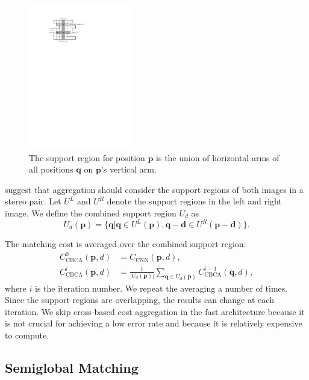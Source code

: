 \documentclass[twoside,11pt]{article}
\begin{document}
\begin{figure}[tb]
\begin{center}
\includegraphics[width=0.4\textwidth]{img/cross}
\end{center}
\caption{The support region for position $\mathbf{p}$ is the union of
horizontal arms of all positions $\mathbf{q}$ on $\mathbf{p}$'s vertical arm.}
\label{fig:cross}
\end{figure}

\citet{zhang2009cross} suggest that aggregation should consider the support
regions of both images in a stereo pair. Let $U^L$ and $U^R$ denote the support
regions in the left and right image. We define the combined support region
$U_d$ as
%
\begin{equation*}
U_d(\mathbf{p}) = \{\mathbf{q} | \mathbf{q} \in U^L(\mathbf{p}), \mathbf{q}-\mathbf{d}
\in U^R(\mathbf{p}-\mathbf{d})\}.
\end{equation*}

The matching cost is averaged over the combined support region:
%
\begin{align*}
C^0_{\text{CBCA}}(\mathbf{p}, d) &= C_{\text{CNN}}(\mathbf{p}, d), \\
C^i_{\text{CBCA}}(\mathbf{p}, d) &= \frac{1}{|U_d(\mathbf{p})|}
\sum_{\mathbf{q} \in U_d(\mathbf{p})} C^{i-1}_{\text{CBCA}}(\mathbf{q}, d),
\end{align*}
%
where $i$ is the iteration number. We repeat the averaging a number of times.
Since the support regions are overlapping, the results can change at each
iteration. We skip cross-based cost aggregation in the fast architecture
because it is not crucial for achieving a low error rate and because it is
relatively expensive to compute.

\subsection{Semiglobal Matching}
\end{document}
